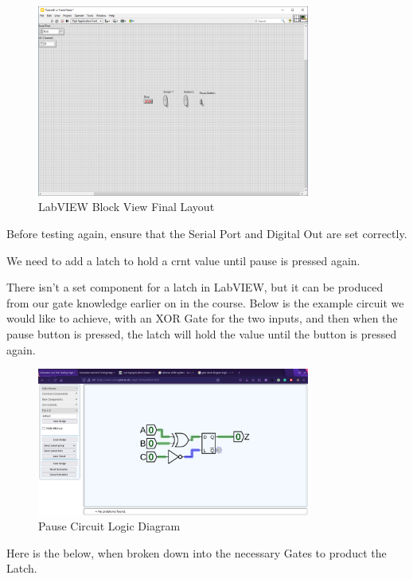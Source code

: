 \documentclass[a4paper,11pt]{report}
\begin{document}
\begin{figure}[H]
\centering
\includegraphics[width=0.8\textwidth]{screenshots/labview32}
\caption{LabVIEW Block View Final Layout}
\end{figure}

Before testing again, ensure that the Serial Port and Digital Out are set correctly.

We need to add a latch to hold a \gls{crnt} value until pause is pressed again.

There isn't a set component for a latch in LabVIEW, but it can be produced from our gate knowledge earlier on in the course. Below is the example circuit we would like to achieve, with an XOR Gate for the two inputs, and then when the pause button is pressed, the latch will hold the value until the button is pressed again.

\begin{figure}[H]
\centering
\includegraphics[width=0.8\textwidth]{screenshots/pausecircuitlatch}
\caption{Pause Circuit Logic Diagram}
\end{figure}

Here is the below, when broken down into the necessary Gates to product the Latch.
\end{document}
